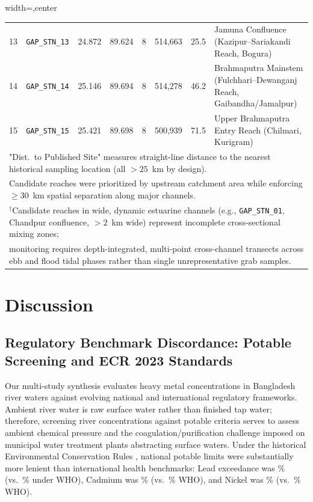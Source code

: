 \documentclass[authoryear,preprint,12pt]{elsarticle}
\begin{document}
\begin{table}[htbp]
\begin{adjustbox}{width=\textwidth,center}
\begin{tabular}{clcccccl}
13 & \texttt{GAP\_STN\_13} & 24.872 & 89.624 & 8 & 514,663 & 25.5 & Jamuna Confluence (Kazipur--Sariakandi Reach, Bogura) \\
14 & \texttt{GAP\_STN\_14} & 25.146 & 89.694 & 8 & 514,278 & 46.2 & Brahmaputra Mainstem (Fulchhari--Dewanganj Reach, Gaibandha/Jamalpur) \\
15 & \texttt{GAP\_STN\_15} & 25.421 & 89.698 & 8 & 500,939 & 71.5 & Upper Brahmaputra Entry Reach (Chilmari, Kurigram) \\
\bottomrule
\multicolumn{8}{l}{\footnotesize "Dist.\ to Published Site" measures straight-line distance to the nearest historical sampling location (all $>25$~km by design).} \\
\multicolumn{8}{l}{\footnotesize Candidate reaches were prioritized by upstream catchment area while enforcing $\ge 30$~km spatial separation along major channels.} \\
\multicolumn{8}{l}{\footnotesize $^\dagger$Candidate reaches in wide, dynamic estuarine channels (e.g., \texttt{GAP\_STN\_01}, Chandpur confluence, $>2$~km wide) represent incomplete cross-sectional mixing zones;} \\
\multicolumn{8}{l}{\footnotesize monitoring requires depth-integrated, multi-point cross-channel transects across ebb and flood tidal phases rather than single unrepresentative grab samples.} \\
\end{tabular}
\end{adjustbox}
\end{table}

\section{Discussion}

\subsection{Regulatory Benchmark Discordance: Potable Screening and ECR 2023 Standards}
Our multi-study synthesis evaluates heavy metal concentrations in Bangladesh river waters against evolving national and international regulatory frameworks. Ambient river water is raw surface water rather than finished tap water; therefore, screening river concentrations against potable criteria serves to assess ambient chemical pressure and the coagulation/purification challenge imposed on municipal water treatment plants abstracting surface waters. Under the historical Environmental Conservation Rules \citep{ECR1997}, national potable limits were substantially more lenient than international health benchmarks: Lead exceedance was \LeadBdNineteenNinetySevenExceedPct\% (vs.\ \LeadWhoExceedPct\% under WHO), Cadmium was \CadmiumBdNineteenNinetySevenExceedPct\% (vs.\ \CadmiumWhoExceedPct\% WHO), and Nickel was \NickelBdNineteenNinetySevenExceedPct\% (vs.\ \NickelWhoExceedPct\% WHO). 
\end{document}

